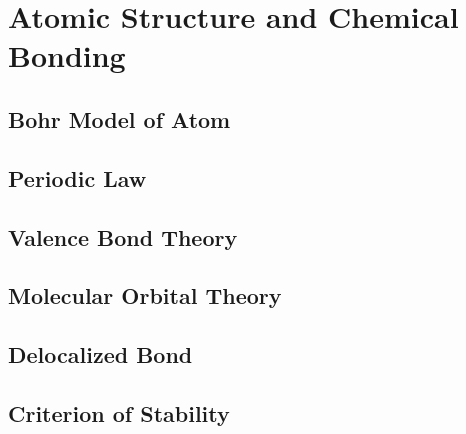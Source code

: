 \section{Atomic Structure and Chemical Bonding}
\subsection{Bohr Model of Atom}
\subsection{Periodic Law}
\subsection{Valence Bond Theory}
\subsection{Molecular Orbital Theory}
\subsection{Delocalized Bond}
\subsection{Criterion of Stability}

\newpage
